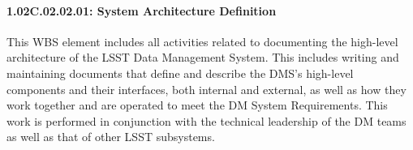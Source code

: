 \paragraph{1.02C.02.02.01: System Architecture Definition}

This WBS element includes all activities related to documenting the high-level
architecture of the LSST Data Management System.  This includes writing and
maintaining documents that define and describe the DMS's high-level components
and their interfaces, both internal and external, as well as how they work
together and are operated to meet the DM System Requirements.  This work is
performed in conjunction with the technical leadership of the DM teams as well
as that of other LSST subsystems.
